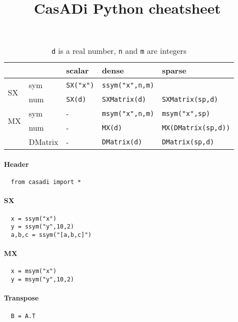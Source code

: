 \documentclass[a4paper,8pt,twocolumn]{article}
\begin{document}
\title{CasADi Python cheatsheet}
\date{}
\maketitle

\begin{center}
\begin{table}
\begin{tabular}{ll|lll}
 & & scalar & dense & sparse \\
\hline
\multirow{2}{*}{SX} & sym & \verb|SX("x")| & \verb|ssym("x",n,m)|  &  \\ 
    & num & \verb|SX(d)|  & \verb|SXMatrix(d)|  & \verb|SXMatrix(sp,d)| \\
\hline
\multirow{2}{*}{MX} & sym & - & \verb|msym("x",n,m)|  & \verb|msym("x",sp)|\\
    & num & - & \verb|MX(d)| &  \verb|MX(DMatrix(sp,d))| \\
\hline
    & DMatrix & -  & \verb|DMatrix(d)|  & \verb|DMatrix(sp,d)| \\
\end{tabular}
\caption{\texttt{d} is a real number, \texttt{n} and \texttt{m} are integers }
\label{tab:constr}
\end{table}
\end{center}



\paragraph{Header}
\begin{verbatim}
  from casadi import *
\end{verbatim}

\paragraph{SX}
\begin{verbatim}
  x = ssym("x")
  y = ssym("y",10,2)
  a,b,c = ssym("[a,b,c]")
\end{verbatim}

\paragraph{MX}
\begin{verbatim}
  x = msym("x")
  y = msym("y",10,2)
\end{verbatim}

\paragraph{Transpose}
\begin{verbatim}
  B = A.T
\end{verbatim}
\end{document}
